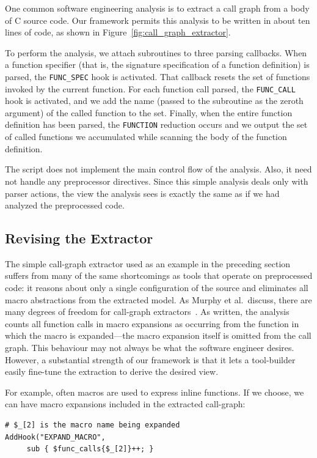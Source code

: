 \documentclass{article}
\newcommand{\C}{\mbox{C}}
\begin{document}
One common software engineering analysis is to extract a call graph from a
body of \C{} source code.  Our framework permits this analysis to be
written in about ten lines of code, as shown in
Figure~\ref{fig:call_graph_extractor}.

To perform the analysis, we attach subroutines to three parsing
callbacks.  When a function specifier (that is, 
the signature specification of a
function definition) is parsed, the \texttt{FUNC\_SPEC} hook is
activated.  That callback resets the set of functions invoked by
the current function.  For each function call parsed, the
\texttt{FUNC\_CALL} hook is activated, and we add the name (passed to
the subroutine as the zeroth argument) of the called function to the
set.  Finally, when the entire function definition has been parsed, the
\texttt{FUNCTION} reduction occurs and we output the set of called
functions we accumulated while scanning the body of the function
definition.

The script does not implement the main control flow of the
analysis.  Also, it need not handle any preprocessor directives.  Since
this simple analysis deals only with parser actions, the view the
analysis sees is exactly the same as if we had analyzed the preprocessed 
code.

\subsection{Revising the Extractor}
\label{sec:call_graph_revised}
The simple call-graph extractor used as an example in the preceding
section suffers from many of the same shortcomings as tools that
operate on preprocessed code: it reasons about only a single
configuration of the source and eliminates all macro abstractions
from the extracted model.  As Murphy et al.\ discuss, there are many
degrees of freedom for call-graph extractors~\cite{Murphy98}.  As
written, the analysis counts all function calls in macro expansions as
occurring from the function in which the macro is expanded---the macro
expansion itself is omitted from the call graph.  This behaviour may not 
always be what the software engineer desires. However, a substantial
strength of our framework is that it lets a tool-builder easily
fine-tune the extraction to derive the desired view.

For example, often macros are used to express inline functions.  If we
choose, we can have macro expansions included in the extracted
call-graph:

\begin{verbatim}
# $_[2] is the macro name being expanded
AddHook("EXPAND_MACRO", 
     sub { $func_calls{$_[2]}++; }
\end{verbatim}
\end{document}
